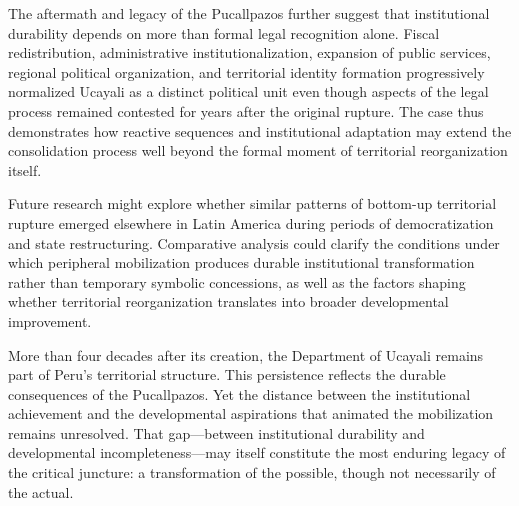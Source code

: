 \documentclass[12pt]{article}
\begin{document}
The aftermath and legacy of the Pucallpazos further suggest that institutional durability depends on more than formal legal recognition alone. Fiscal redistribution, administrative institutionalization, expansion of public services, regional political organization, and territorial identity formation progressively normalized Ucayali as a distinct political unit even though aspects of the legal process remained contested for years after the original rupture. The case thus demonstrates how reactive sequences and institutional adaptation may extend the consolidation process well beyond the formal moment of territorial reorganization itself.

Future research might explore whether similar patterns of bottom-up territorial rupture emerged elsewhere in Latin America during periods of democratization and state restructuring. Comparative analysis could clarify the conditions under which peripheral mobilization produces durable institutional transformation rather than temporary symbolic concessions, as well as the factors shaping whether territorial reorganization translates into broader developmental improvement.

More than four decades after its creation, the Department of Ucayali remains part of Peru's territorial structure. This persistence reflects the durable consequences of the Pucallpazos. Yet the distance between the institutional achievement and the developmental aspirations that animated the mobilization remains unresolved. That gap---between institutional durability and developmental incompleteness---may itself constitute the most enduring legacy of the critical juncture: a transformation of the possible, though not necessarily of the actual.

\printbibliography
\end{document}
